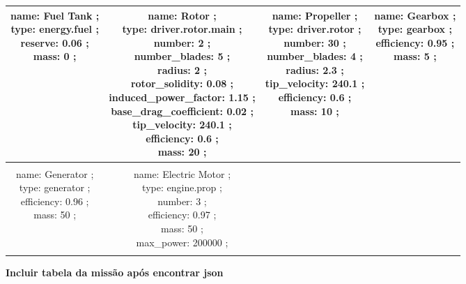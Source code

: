 \begin{table}[h]
\begin{adjustbox}{width=1\textwidth}
\begin{tabular}{|c|c|c|c|}
\makecell{name: Fuel Tank ; \\ type: energy.fuel ; \\ reserve: 0.06 ; \\ mass: 0 ; \\ } & \makecell{name: Rotor ; \\ type: driver.rotor.main ; \\ number: 2 ; \\ number\_blades: 5 ; \\ radius: 2 ; \\ rotor\_solidity: 0.08 ; \\ induced\_power\_factor: 1.15 ; \\ base\_drag\_coefficient: 0.02 ; \\ tip\_velocity: 240.1 ; \\ efficiency: 0.6 ; \\ mass: 20 ; \\ } & \makecell{name: Propeller ; \\ type: driver.rotor ; \\ number: 30 ; \\ number\_blades: 4 ; \\ radius: 2.3 ; \\ tip\_velocity: 240.1 ; \\ efficiency: 0.6 ; \\ mass: 10 ; \\ } & \makecell{name: Gearbox ; \\ type: gearbox ; \\ efficiency: 0.95 ; \\ mass: 5 ; \\ }\\ \hline \\ 
\makecell{name: Generator ; \\ type: generator ; \\ efficiency: 0.96 ; \\ mass: 50 ; \\ } & \makecell{name: Electric Motor ; \\ type: engine.prop ; \\ number: 3 ; \\ efficiency: 0.97 ; \\ mass: 50 ; \\ max\_power: 200000 ; \\ } &  & \\ \hline \\ 
\end{tabular} 
 \end{adjustbox} 
 \end{table} 
 \FloatBarrier 
 
{\Large\textbf{Incluir tabela da missão após encontrar json}}